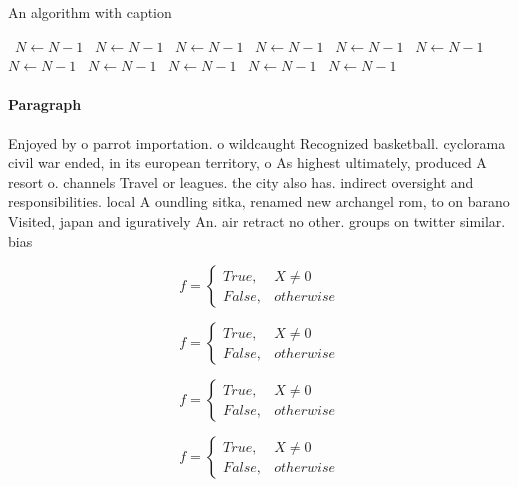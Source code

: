 \documentclass[a4paper]{article}
\begin{document}
\begin{algorithm}
\caption{An algorithm with caption}
\begin{algorithmic}
\    \State $N \gets N - 1$
\    \State $N \gets N - 1$
\    \State $N \gets N - 1$
\    \State $N \gets N - 1$
\    \State $N \gets N - 1$
\    \State $N \gets N - 1$
\    \State $N \gets N - 1$
\    \State $N \gets N - 1$
\    \State $N \gets N - 1$
\    \State $N \gets N - 1$
\    \State $N \gets N - 1$
\EndWhile
\end{algorithmic}
\end{algorithm}

\paragraph{Paragraph}
Enjoyed by o parrot importation. o wildcaught Recognized basketball. cyclorama civil war ended, in its european territory, o As highest ultimately, produced A resort o. channels Travel or leagues. the city also has. indirect oversight and responsibilities. local A oundling sitka, renamed new archangel rom, to on barano Visited, japan and iguratively An. air retract no other. groups on twitter similar. bias


\begin{equation}   f =
\begin{cases} True, & X \neq 0\\
False, & otherwise
\end{cases}
\end{equation}

\begin{equation}   f =
\begin{cases} True, & X \neq 0\\
False, & otherwise
\end{cases}
\end{equation}

\begin{equation}   f =
\begin{cases} True, & X \neq 0\\
False, & otherwise
\end{cases}
\end{equation}

\begin{equation}   f =
\begin{cases} True, & X \neq 0\\
False, & otherwise
\end{cases}
\end{equation}
\end{document}
